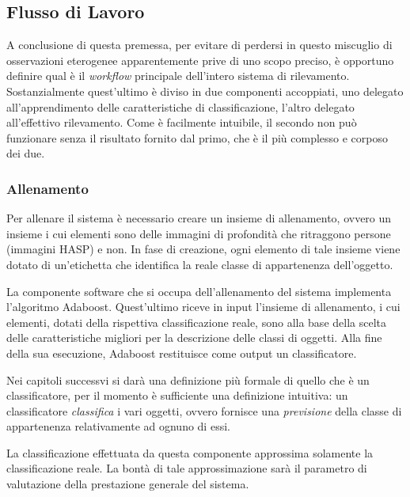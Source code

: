         \subsection{Flusso di Lavoro}
        \label{sub:overall_workflow}
            A conclusione di questa premessa, per evitare di perdersi in questo miscuglio di osservazioni eterogenee apparentemente prive di uno scopo preciso, è opportuno definire qual è il \emph{workflow} principale dell'intero sistema di rilevamento.
            Sostanzialmente quest'ultimo è diviso in due componenti accoppiati, uno delegato all'apprendimento delle caratteristiche di classificazione, l'altro delegato all'effettivo rilevamento.
            Come è facilmente intuibile, il secondo non può funzionare senza il risultato fornito dal primo, che è il più complesso e corposo dei due.

            \subsubsection{Allenamento}
                Per allenare il sistema è necessario creare un insieme di allenamento, ovvero un insieme i cui elementi sono delle immagini di profondità che ritraggono persone (immagini HASP) e non.
                In fase di creazione, ogni elemento di tale insieme viene dotato di un'etichetta che identifica la reale classe di appartenenza dell'oggetto.

                La componente software che si occupa dell'allenamento del sistema implementa l'algoritmo Adaboost.
                Quest'ultimo riceve in input l'insieme di allenamento, i cui elementi, dotati della rispettiva classificazione reale, sono alla base della scelta delle caratteristiche migliori per la descrizione delle classi di oggetti.
                Alla fine della sua esecuzione, Adaboost restituisce come output un classificatore.

                Nei capitoli successvi si darà una definizione più formale di quello che è un classificatore, per il momento è sufficiente una definizione intuitiva: un classificatore \emph{classifica} i vari oggetti, ovvero fornisce una \emph{previsione} della classe di appartenenza relativamente ad ognuno di essi.

                La classificazione effettuata da questa componente approssima solamente la classificazione reale. 
                La bontà di tale approssimazione sarà il parametro di valutazione della prestazione generale del sistema.

